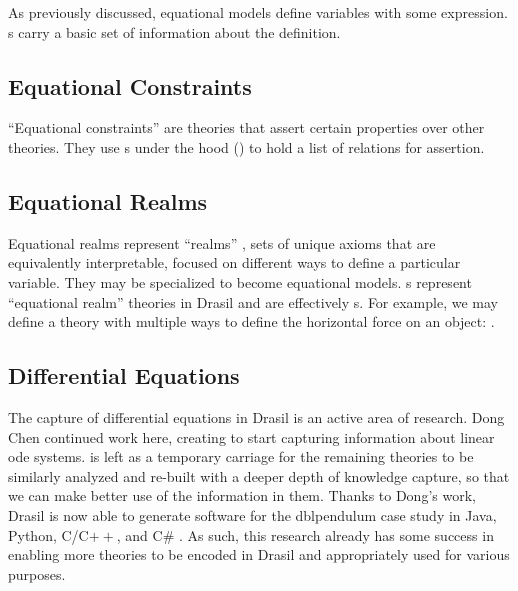As previously discussed, equational models define variables with some
expression. \QDefinition{}s carry a basic set of information about the
definition.

\currentLandPosIMHaskell{}

\currentQDefinitionHaskell{}

\subsection{Equational Constraints}
\label{chap:more-theory-kinds:sec:classify-all-the-theories:subsec:equational-constraints}

``Equational constraints'' are theories that assert certain properties over
other theories. They use \ConstraintSet{}s under the hood
() to hold a list of relations for assertion.

\currentExampleEquationalConstraintsHaskell{}

\currentConstraintSetHaskell{}

\subsection{Equational Realms}
\label{chap:more-theory-kinds:sec:classify-all-the-theories:subsec:equational-realms}

Equational realms represent ``realms'' \cite{Carette2014realms}, sets of unique
axioms that are equivalently interpretable, focused on different ways to define
a particular variable. They may be specialized to become equational models.
\EquationalRealm{}s represent ``equational realm'' theories in Drasil and are
effectively \MultiDefn{}s. For example, we may define a theory with multiple
ways to define the horizontal force on an object:
.

\currentExampleEquationalRealmHaskell{}

\currentMultiDefnHaskell{}

\currentDefiningExprHaskell{}

\subsection{Differential Equations}
\label{chap:more-theory-kinds:sec:classify-all-the-theories:subsec:differential-equations}

The capture of differential equations in Drasil is an active area of research.
Dong Chen continued work here, creating \NewDEModel{} \cite{Chen2022MEng} to
start capturing information about linear \acs{ode} systems. \DEModel{} is left
as a temporary carriage for the remaining theories to be similarly analyzed and
re-built with a deeper depth of knowledge capture, so that we can make better
use of the information in them. Thanks to Dong's work, Drasil is now able to
generate software for the \acs{dblpendulum} case study in Java, Python, C/C$++$,
and C\# \cite{Chen2022MEng}. As such, this research already has some success in
enabling more theories to be encoded in Drasil and appropriately used for
various purposes.

